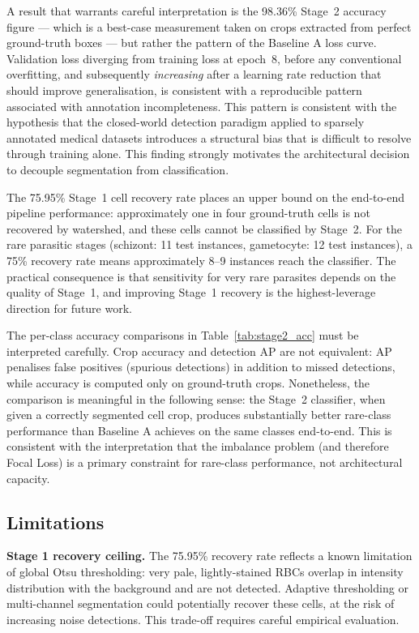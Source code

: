 \documentclass[review,12pt]{elsarticle}
\begin{document}
A result that warrants careful interpretation is the 98.36\% Stage~2
accuracy figure --- which is a best-case measurement taken on crops extracted
from perfect ground-truth boxes --- but rather the pattern of the Baseline A
loss curve. Validation loss diverging from training loss at epoch~8, before
any conventional overfitting, and subsequently \emph{increasing} after a
learning rate reduction that should improve generalisation, is consistent with a reproducible pattern associated with annotation incompleteness. This pattern is consistent with the hypothesis that the closed-world
detection paradigm applied to sparsely annotated medical datasets
introduces a structural bias that is difficult to resolve through
training alone. This finding strongly motivates the architectural decision
to decouple segmentation from classification.

The 75.95\% Stage~1 cell recovery rate places an upper bound on the
end-to-end pipeline performance: approximately one in four ground-truth
cells is not recovered by watershed, and these cells cannot be classified
by Stage~2. For the rare parasitic stages (schizont: 11 test instances,
gametocyte: 12 test instances), a 75\% recovery rate means approximately
8--9 instances reach the classifier. The practical consequence is that
sensitivity for very rare parasites depends on the quality of Stage~1,
and improving Stage~1 recovery is the highest-leverage direction for
future work.

The per-class accuracy comparisons in Table~\ref{tab:stage2_acc} must be
interpreted carefully. Crop accuracy and detection AP are not equivalent:
AP penalises false positives (spurious detections) in addition to missed
detections, while accuracy is computed only on ground-truth crops.
Nonetheless, the comparison is meaningful in the following sense: the
Stage~2 classifier, when given a correctly segmented cell crop, produces
substantially better rare-class performance than Baseline A achieves
on the same classes end-to-end. This is consistent with the interpretation that the imbalance problem
(and therefore Focal Loss) is a primary constraint for rare-class
performance, not architectural capacity.

\subsection{Limitations}
\label{ssec:limits}

\textbf{Stage 1 recovery ceiling.} The 75.95\% recovery rate reflects a
known limitation of global Otsu thresholding: very pale, lightly-stained
RBCs overlap in intensity distribution with the background and are not
detected. Adaptive thresholding or multi-channel segmentation could
potentially recover these cells, at the risk of increasing noise detections.
This trade-off requires careful empirical evaluation.
\end{document}
